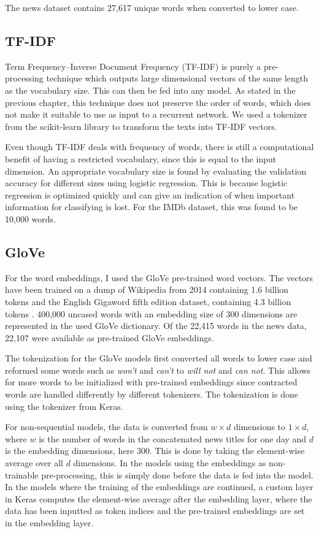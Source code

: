 The news dataset contains 27,617 unique words when converted to lower case. 

\subsection{TF-IDF}
Term Frequency--Inverse Document Frequency (TF-IDF) is purely a pre-processing technique which outputs large dimensional vectors of the same length as the vocabulary size. This can then be fed into any model. As stated in the previous chapter, this technique does not preserve the order of words, which does not make it suitable to use as input to a recurrent network. We used a tokenizer from the scikit-learn library to transform the texts into TF-IDF vectors. 

Even though TF-IDF deals with frequency of words, there is still a computational benefit of having a restricted vocabulary, since this is equal to the input dimension. An appropriate vocabulary size is found by evaluating the validation accuracy for different sizes using logistic regression. This is because logistic regression is optimized quickly and can give an indication of when important information for classifying is lost. For the IMDb dataset, this was found to be 10,000 words. 

\subsection{GloVe}

For the word embeddings, I used the GloVe pre-trained word vectors. The vectors have been trained on a dump of Wikipedia from 2014 containing 1.6 billion tokens and the English Gigaword fifth edition dataset, containing 4.3 billion tokens \citep{pennington2014glove}. 400,000 uncased words with an embedding size of 300 dimensions are represented in the used GloVe dictionary. Of the 22,415 words in the news data, 22,107 were available as pre-trained GloVe embeddings. 

The tokenization for the GloVe models first converted all words to lower case and reformed some words such as \textit{won't} and \textit{can't} to \textit{will not} and \textit{can not}. This allows for more words to be initialized with pre-trained embeddings since contracted words are handled differently by different tokenizers. The tokenization is done using the tokenizer from Keras.  

For non-sequential models, the data is converted from $w \times d$ dimensions to $1 \times d$, where $w$ is the number of words in the concatenated news titles for one day and $d$ is the embedding dimensions, here 300. This is done by taking the element-wise average over all $d$ dimensions. In the models using the embeddings as non-trainable pre-processing, this is simply done before the data is fed into the model. In the models where the training of the embeddings are continued, a custom layer in Keras computes the element-wise average after the embedding layer, where the data has been inputted as token indices and the pre-trained embeddings are set in the embedding layer.

